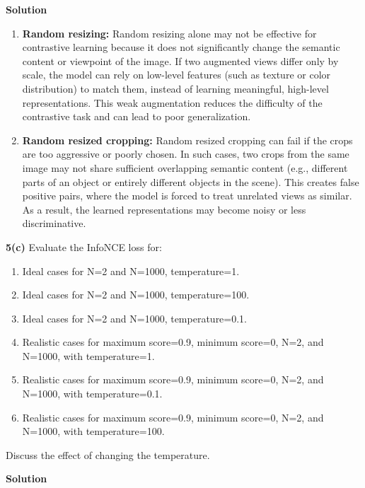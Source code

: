 \documentclass[10pt]{article}
\begin{document}
\textbf{Solution}

\begin{enumerate}[label=\roman*.]
	
	\item \textbf{Random resizing:}  
	Random resizing alone may not be effective for contrastive learning because it does not significantly change the semantic content or viewpoint of the image. If two augmented views differ only by scale, the model can rely on low-level features (such as texture or color distribution) to match them, instead of learning meaningful, high-level representations. This weak augmentation reduces the difficulty of the contrastive task and can lead to poor generalization.
	
	\item \textbf{Random resized cropping:}  
	Random resized cropping can fail if the crops are too aggressive or poorly chosen. In such cases, two crops from the same image may not share sufficient overlapping semantic content (e.g., different parts of an object or entirely different objects in the scene). This creates false positive pairs, where the model is forced to treat unrelated views as similar. As a result, the learned representations may become noisy or less discriminative.
	
\end{enumerate}

\newpage

\textbf{5(c)} Evaluate the InfoNCE loss for:

\begin{enumerate}[label=\roman*.]
    \item Ideal cases for N=2 and N=1000, temperature=1.
    \item Ideal cases for N=2 and N=1000, temperature=100.
    \item Ideal cases for N=2 and N=1000, temperature=0.1.
    \item Realistic cases for maximum score=0.9, minimum score=0, N=2, and N=1000, with temperature=1.
    \item Realistic cases for maximum score=0.9, minimum score=0, N=2, and N=1000, with temperature=0.1.
    \item Realistic cases for maximum score=0.9, minimum score=0, N=2, and N=1000, with temperature=100.
\end{enumerate}

Discuss the effect of changing the temperature.

\textbf{Solution}
\end{document}
